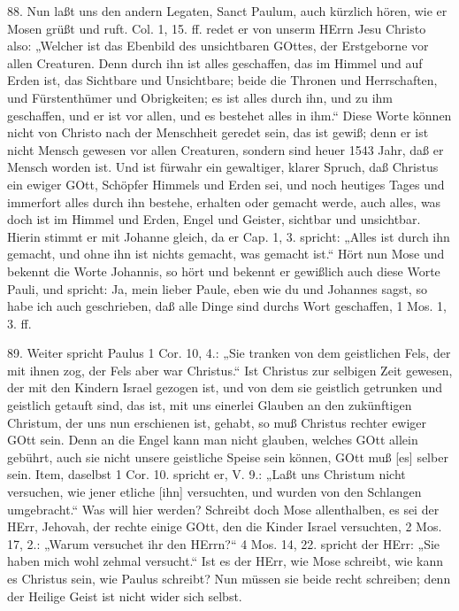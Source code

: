 88. Nun laßt uns den andern Legaten, Sanct Paulum, auch kürzlich hören, wie er Mosen grüßt und ruft. Col. 1, 15. ff. redet er von unserm HErrn Jesu Christo also: „Welcher ist das Ebenbild des unsichtbaren GOttes, der Erstgeborne vor allen Creaturen. Denn durch ihn ist alles geschaffen, das im Himmel und auf Erden ist, das Sichtbare und Unsichtbare; beide die Thronen und Herrschaften, und Fürstenthümer und Obrigkeiten; es ist alles durch ihn, und zu ihm geschaffen, und er ist vor allen, und es bestehet alles in ihm.“ Diese Worte können nicht von Christo nach der Menschheit geredet sein, das ist gewiß; denn er ist nicht Mensch gewesen vor allen Creaturen, sondern sind heuer 1543 Jahr, daß er Mensch worden ist. Und ist fürwahr ein gewaltiger, klarer Spruch, daß Christus ein ewiger GOtt, Schöpfer Himmels und Erden sei, und noch heutiges Tages und immerfort alles durch ihn bestehe, erhalten oder gemacht werde, auch alles, was doch ist im Himmel und Erden, Engel und Geister, sichtbar und unsichtbar. Hierin stimmt er mit Johanne gleich, da er Cap. 1, 3. spricht: „Alles ist durch ihn gemacht, und ohne ihn ist nichts gemacht, was gemacht ist.“ Hört nun Mose und bekennt die Worte Johannis, so hört und bekennt er gewißlich auch diese Worte Pauli, und spricht: Ja, mein lieber Paule, eben wie du und Johannes sagst, so habe ich auch geschrieben, daß alle Dinge sind durchs Wort geschaffen, 1 Mos. 1, 3. ff.

89. Weiter spricht Paulus 1 Cor. 10, 4.: „Sie tranken von dem geistlichen Fels, der mit ihnen zog, der Fels aber war Christus.“ Ist Christus zur selbigen Zeit gewesen, der mit den Kindern Israel gezogen ist, und von dem sie geistlich getrunken und geistlich getauft sind, das ist, mit uns einerlei Glauben an den zukünftigen Christum, der uns nun erschienen ist, gehabt, so muß Christus rechter ewiger GOtt sein. Denn an die Engel kann man nicht glauben, welches GOtt allein gebührt, auch sie nicht unsere geistliche Speise sein können, GOtt muß [es] selber sein. Item, daselbst 1 Cor. 10. spricht er, V. 9.: „Laßt uns Christum nicht versuchen, wie jener etliche [ihn] versuchten, und wurden von den Schlangen umgebracht.“ Was will hier werden? Schreibt doch Mose allenthalben, es sei der HErr, Jehovah, der rechte einige GOtt, den die Kinder Israel versuchten, 2 Mos. 17, 2.: „Warum versuchet ihr den HErrn?“ 4 Mos. 14, 22. spricht der HErr: „Sie haben mich wohl zehmal versucht.“ Ist es der HErr, wie Mose schreibt, wie kann es Christus sein, wie Paulus schreibt? Nun müssen sie beide recht schreiben; denn der Heilige Geist ist nicht wider sich selbst.

